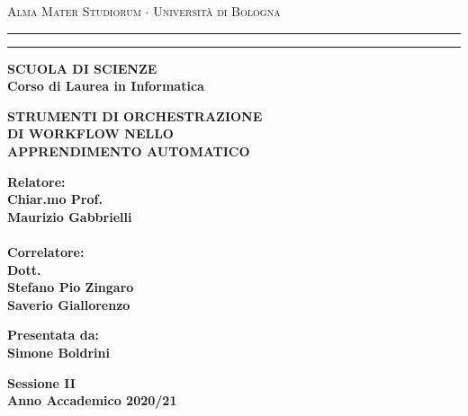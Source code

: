 \documentclass[../tesi.tex]{subfiles}
\begin{document}
\begin{titlepage}
\begin{center}
{{\Large{\textsc{Alma Mater Studiorum $\cdot$ Universit\`a di
Bologna}}}} \rule[0.1cm]{15.8cm}{0.1mm}
\rule[0.5cm]{15.8cm}{0.6mm}
{\small{\bf SCUOLA DI SCIENZE\\
Corso di Laurea in Informatica }}
\end{center}
\vspace{15mm}
\begin{center}
{\LARGE{\bf STRUMENTI DI ORCHESTRAZIONE}}\\
\vspace{3mm}
{\LARGE{\bf DI WORKFLOW NELLO}}\\
\vspace{3mm}
{\LARGE{\bf APPRENDIMENTO AUTOMATICO}}\\
\end{center}
\vspace{40mm}
\par
\noindent
\begin{minipage}[t]{0.47\textwidth}
{\large{\bf Relatore:\\
Chiar.mo Prof.\\
Maurizio Gabbrielli}}\\
\\{\large{\bf Correlatore:\\
Dott.\\Stefano Pio Zingaro\\Saverio Giallorenzo}}
\end{minipage}
\hfill
\begin{minipage}[t]{0.47\textwidth}\raggedleft
{\large{\bf Presentata da:\\ Simone Boldrini}}
\end{minipage}
\vspace{20mm}
\begin{center}
{\large{\bf Sessione II\\
Anno Accademico 2020/21}}
\end{center}
\end{titlepage}
\end{document}
